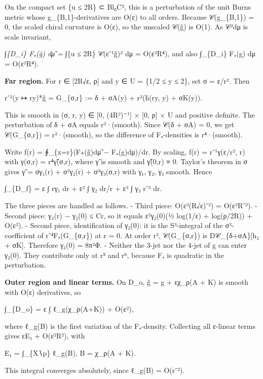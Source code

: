 \documentclass[
  10pt,
]{report}
\begin{document}
On the compact set \{\textbar u\textbar{} ≤ 2R\} ⊂ Bl₀C², this is a
perturbation of the unit Burns metric whose g\_\{B,1\}-derivatives are
O(ε) to all orders. Because 𝒞(g\_\{B,1\}) = 0, the scaled chiral
curvature is O(ε), so the unscaled 𝒞(g̃) is O(1). As
\textbar 𝒞\textbar²dμ is scale invariant,

∫\emph{\{D\_i\} F₊(g̃) dμ̃ = ∫}\{\textbar u\textbar{} ≤ 2R\}
\textbar 𝒞(ε⁻¹g̃)\textbar² dμ = O(ε²R⁴), and also ∫\_\{D\_i\} F₊(g) dμ =
O(ε²R⁴).

\textbf{Far region.} For r ∈ {[}2R√ε, ρ{]} and y ∈ U = \{1/2 ≤
\textbar y\textbar{} ≤ 2\}, set σ = ε/r². Then

r⁻²(y ↦ ry)*g̃ = G\_\{σ,r\} := δ + σA(y) + r²(h̄(ry, y) + σK(y)).

This is smooth in (σ, r, y) ∈ {[}0, (4R²)⁻¹{]} × {[}0, ρ{]} × U and
positive definite. The perturbation of δ + σA equals r²·(smooth). Since
𝒞(δ + σA) = 0, we get 𝒞(G\_\{σ,r\}) = r²·(smooth), so the difference of
F₊-densities is r⁴·(smooth).

Write f(r) = ∮\_\{\textbar x\textbar=r\}(F₊(g̃)dμ̃ − F₊(g)dμ)/dr. By
scaling, f(r) = r⁻¹γ(ε/r², r) with γ(σ,r) = r⁴γ̃(σ,r), where γ̃ is smooth
and γ̃(0,r) ≡ 0. Taylor's theorem in σ gives γ̃ = σγ₁(r) + σ²γ₂(r) +
σ³γ₃(σ,r) with γ₁, γ₂, γ₃ smooth. Hence

∫\_\{D\_f\} = ε ∫ rγ₁ dr + ε² ∫ γ₂ dr/r + ε³ ∫ γ₃ r⁻³ dr.

The three pieces are handled as follows. - Third piece: O(ε³(R√ε)⁻²) =
O(ε²R⁻²). - Second piece: \textbar γ₂(r) − γ₂(0)\textbar{} ≤ Cr, so it
equals ε²γ₂(0)(½ log(1/ε) + log(ρ/2R)) + O(ε²). - Second piece,
identification of γ₂(0): it is the S³-integral of the σ²-coefficient of
r⁻⁴F₊(G\_\{σ,r\}) at r = 0. At order r², 𝒞(G\_\{σ,r\}) is
D𝒞\_\{δ+σA\}{[}h₂ + σK{]}. Therefore γ₂(0) = 8π²Φ. - Neither the 3-jet
nor the 4-jet of g can enter γ₂(0). They contribute only at r⁵ and r⁶,
because F₊ is quadratic in the perturbation.

\textbf{Outer region and linear terms.} On D\_o, g̃ = g + εχ\_ρ(A + K) is
smooth with O(ε) derivatives, so

∫\_\{D\_o\} = ε ∫ ℓ\_g(χ\_ρ(A+K)) + O(ε²),

where ℓ\_g(B) is the first variation of the F₊-density. Collecting all
ε-linear terms gives εE₁ + O(ε²R²), with

E₁ = ∫\_\{X∖p\} ℓ\_g(B), B = χ\_ρ(A + K).

This integral converges absolutely, since ℓ\_g(B) = O(r⁻²).
\end{document}
